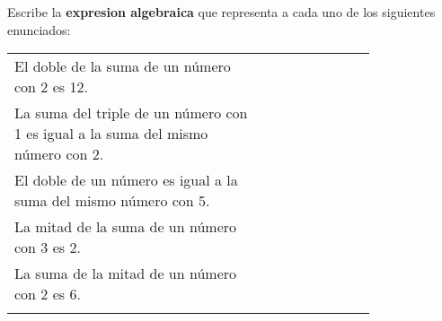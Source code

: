 Escribe la \textbf{expresion algebraica} que representa a cada uno de los siguientes enunciados:
    \begin{table}[H]
        \centering
        \begin{tabular}{b{0.55\linewidth}b{0.25\linewidth}}
            El doble de la suma de un n\'umero con 2 es 12.                                      & \hrulefill \\ \vspace{0.5cm}
            La suma del triple de un n\'umero con 1 es igual a la suma del mismo n\'umero con 2. & \hrulefill \\ \vspace{0.5cm}
            El doble de un n\'umero es igual a la suma del mismo n\'umero con 5.                 & \hrulefill \\ \vspace{0.5cm}
            La mitad de la suma de un n\'umero con 3 es 2.                                       & \hrulefill \\ \vspace{0.5cm}
            La suma de la mitad de un n\'umero con 2 es 6.                                       & \hrulefill \\ \vspace{0.5cm}
        \end{tabular}
    \end{table}